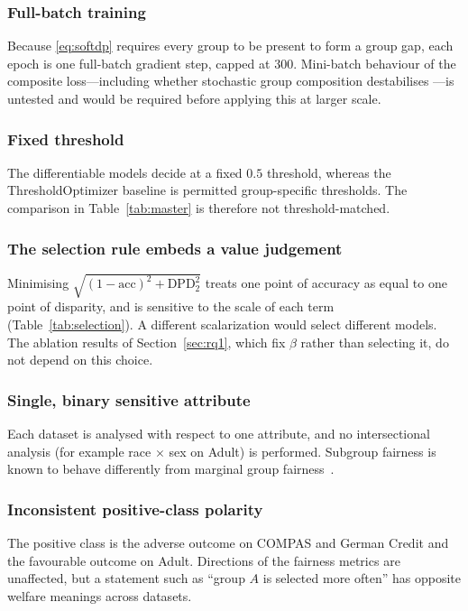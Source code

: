 \subsubsection{Full-batch training}
Because \eqref{eq:softdp} requires every group to be present to form a group
gap, each epoch is one full-batch gradient step, capped at $300$. Mini-batch
behaviour of the composite loss---including whether stochastic group
composition destabilises \softdp{}---is untested and would be required before
applying this at larger scale.

\subsubsection{Fixed threshold}
The differentiable models decide at a fixed $0.5$ threshold, whereas the
ThresholdOptimizer baseline is permitted group-specific thresholds. The
comparison in Table~\ref{tab:master} is therefore not threshold-matched.

\subsubsection{The selection rule embeds a value judgement}
Minimising $\sqrt{(1-\mathrm{acc})^2 + \mathrm{DPD}_2^2}$ treats one point of
accuracy as equal to one point of disparity, and is sensitive to the scale of
each term (Table~\ref{tab:selection}). A different scalarization would select
different models. The ablation results of Section~\ref{sec:rq1}, which fix
$\beta$ rather than selecting it, do not depend on this choice.

\subsubsection{Single, binary sensitive attribute}
Each dataset is analysed with respect to one attribute, and no intersectional
analysis (for example race $\times$ sex on Adult) is performed. Subgroup
fairness is known to behave differently from marginal group
fairness~\cite{kearns2018preventing}.

\subsubsection{Inconsistent positive-class polarity}
The positive class is the adverse outcome on COMPAS and German Credit and the
favourable outcome on Adult. Directions of the fairness metrics are unaffected,
but a statement such as ``group $A$ is selected more often'' has opposite
welfare meanings across datasets.

